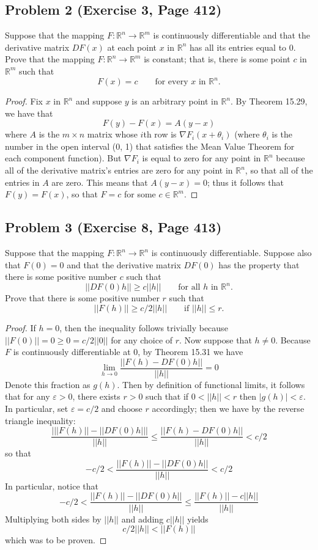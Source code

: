 \documentclass{article}
\begin{document}
\subsection*{Problem 2 (Exercise 3, Page 412)}
Suppose that the mapping $F \colon \mathbb{R}^n \to \mathbb{R}^m$ is continuously differentiable and that the derivative matrix $DF(x)$ at each point $x$ in $\mathbb{R}^n$ has all its entries equal to 0. Prove that the mapping $F\colon \mathbb{R}^n \to \mathbb{R}^m$ is constant; that is, there is some point $c$ in $\mathbb{R}^m$ such that 
\[ F(x) = c \qquad \text{for every $x$ in $\mathbb{R}^n$}.\]
\begin{proof} 
Fix $x$ in $\mathbb{R}^n$ and suppose $y$ is an arbitrary point in $\mathbb{R}^n$. By Theorem 15.29, we have that
\[ F(y) - F(x) = A(y-x)\]
where $A$ is the $m \times n$ matrix whose $i$th row is $\nabla F_i(x + \theta_i)$ (where $\theta_i$ is the number in the open interval (0, 1) that satisfies the Mean Value Theorem for each component function). But $\nabla F_i$ is equal to zero for any point in $\mathbb{R}^n$ because all of the derivative matrix's entries are zero for any point in $\mathbb{R}^n$, so that all of the entries in $A$ are zero. This means that $A(y-x) = 0$; thus it follows that $F(y) = F(x)$, so that $F = c$ for some $c \in \mathbb{R}^m$.

\end{proof}

\subsection*{Problem 3 (Exercise 8, Page 413)}
Suppose that the mapping $F\colon \mathbb{R}^n \to \mathbb{R}^n$ is continuously differentiable. Suppose also that $F(0) = 0$ and that the derivative matrix $DF(0)$ has the property that there is some positive number $c$ such that 
\[ ||DF(0)h|| \geq c||h|| \qquad \text{for all $h$ in $\mathbb{R}^n$}.\]
Prove that there is some positive number $r$ such that
\[ ||F(h)|| \geq c/2||h|| \qquad \text{if $||h|| \leq r$}.\]
\begin{proof}
If $h = 0$, then the inequality follows trivially because $||F(0)|| = 0 \geq 0 = c/2||0||$ for any choice of $r$. Now suppose that $h \neq 0$. Because $F$ is continuously differentiable at 0, by Theorem 15.31 we have
\[ \lim_{h\to 0} \frac{||F(h) - DF(0)h||}{||h||} = 0\]
Denote this fraction as $g(h)$. Then by definition of functional limits, it follows that for any $\varepsilon > 0$, there exists $r > 0$ such that if $0 < ||h|| < r$ then $|g(h)| < \varepsilon$. In particular, set $\varepsilon = c/2$ and choose $r$ accordingly; then we have by the reverse triangle inequality:
\[ \frac{\big| ||F(h)|| - ||DF(0)h||\big|}{||h||} \leq \frac{||F(h) - DF(0)h||}{||h||} < c/2\]
so that
\[ -c/2 < \frac{||F(h)|| - ||DF(0)h||}{||h||} < c/2\]
In particular, notice that
\[ -c/2 < \frac{||F(h)|| - ||DF(0)h||}{||h||} \leq \frac{||F(h)|| - c||h||}{||h||}\]
Multiplying both sides by $||h||$ and adding $c||h||$ yields
\[ c/2||h|| < ||F(h)||\]
which was to be proven.
\end{proof}
\end{document}
